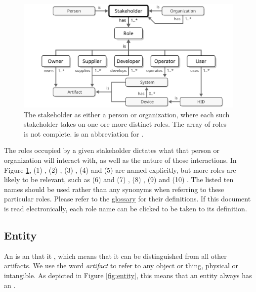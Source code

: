 \vfill

\begin{figure}[ht!]
  \centering
  \includegraphics[scale=0.9]{figures/stakeholder}
  \caption{
    The stakeholder as either a person or organization, where each such stakeholder takes on one ore more distinct roles.
    The array of roles is not complete.
     is an abbreviation for .
  }
  \label{fig:stakeholder}
\end{figure}

The roles occupied by a given stakeholder dictates what  that person or organization will interact with, as well as the nature of those interactions.
In Figure \ref{fig:stakeholder}, (1) , (2) , (3) , (4)  and (5)  are named explicitly, but more roles are likely to be relevant, such as (6)  and (7) , (8) , (9)  and (10) .
The listed ten names should be used rather than any synonyms when referring to these particular roles.
Please refer to the \hyperref[sec:glossary]{glossary} for their definitions.
If this document is read electronically, each role name can be clicked to be taken to its definition.

\subsection{Entity}
\label{sec:concepts:entity}

An  is an  that it , which means that it can be distinguished from all other artifacts.
We use the word \textit{artifact} to refer to any object or thing, physical or intangible.
As depicted in Figure \ref{fig:entity}, this means that an entity always has an .

